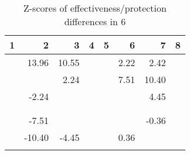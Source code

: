 \begin{table}[ht]
\centering
\begin{tabular}{rrrrrrrr}
  \hline
1 & 2 & 3 & 4 & 5 & 6 & 7 & 8 \\ 
  \hline
 & 13.96 & 10.55 &  &  & 2.22 & 2.42 &  \\ 
   &  & 2.24 &  &  & 7.51 & 10.40 &  \\ 
   & -2.24 &  &  &  &  & 4.45 &  \\ 
   &  &  &  &  &  &  &  \\ 
   &  &  &  &  &  &  &  \\ 
   & -7.51 &  &  &  &  & -0.36 &  \\ 
   & -10.40 & -4.45 &  &  & 0.36 &  &  \\ 
   &  &  &  &  &  &  &  \\ 
   \hline
\end{tabular}
\caption{Z-scores of effectiveness/protection differences in  6} 
\end{table}
